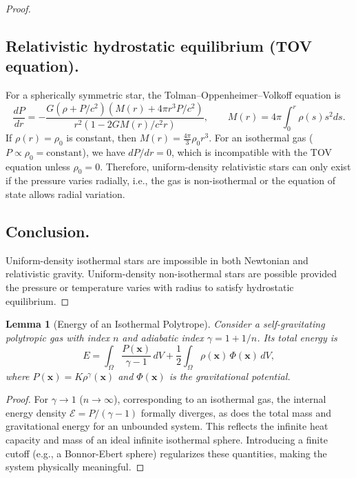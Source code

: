 \documentclass[12pt,a4paper]{article}
\newtheorem{lem}[thm]{Lemma}
\numberwithin{equation}{section}
\begin{document}
\begin{proof}
\subsection*{Relativistic hydrostatic equilibrium (TOV equation).}
For a spherically symmetric star, the Tolman--Oppenheimer--Volkoff equation is
\begin{equation}
\frac{dP}{dr} = - \frac{G (\rho + P/c^2) (M(r) + 4\pi r^3 P/c^2)}{r^2 (1 - 2G M(r)/c^2 r)},
\qquad M(r) = 4 \pi \int_0^r \rho(s) s^2 ds.
\end{equation}
If $\rho(r) = \rho_0$ is constant, then $M(r) = \frac{4\pi}{3} \rho_0 r^3$.
For an isothermal gas ($P \propto \rho_0 = \text{constant}$), we have $dP/dr = 0$, which is incompatible with the TOV equation unless $\rho_0 = 0$.
Therefore, uniform-density relativistic stars can only exist if the pressure varies radially, i.e., the gas is non-isothermal or the equation of state allows radial variation.

\subsection*{Conclusion.}
Uniform-density isothermal stars are impossible in both Newtonian and relativistic gravity. Uniform-density non-isothermal stars are possible provided the pressure or temperature varies with radius to satisfy hydrostatic equilibrium.
\end{proof}

\begin{lem}[Energy of an Isothermal Polytrope]
Consider a self-gravitating polytropic gas with index $n$ and adiabatic index $\gamma = 1 + 1/n$. Its total energy is
\begin{equation}
E = \int_{\Omega} \frac{P(\mathbf{x})}{\gamma-1} \, dV + \frac{1}{2} \int_{\Omega} \rho(\mathbf{x}) \, \Phi(\mathbf{x}) \, dV,
\end{equation}
where $P(\mathbf{x}) = K \rho^\gamma(\mathbf{x})$ and $\Phi(\mathbf{x})$ is the gravitational potential.
\end{lem}

\begin{proof}
For $\gamma \to 1$ ($n \to \infty$), corresponding to an isothermal gas, the internal energy density $\mathcal{E} = P/(\gamma-1)$ formally diverges, as does the total mass and gravitational energy for an unbounded system. This reflects the infinite heat capacity and mass of an ideal infinite isothermal sphere. Introducing a finite cutoff (e.g., a Bonnor-Ebert sphere) regularizes these quantities, making the system physically meaningful.
\end{proof}
\end{document}
